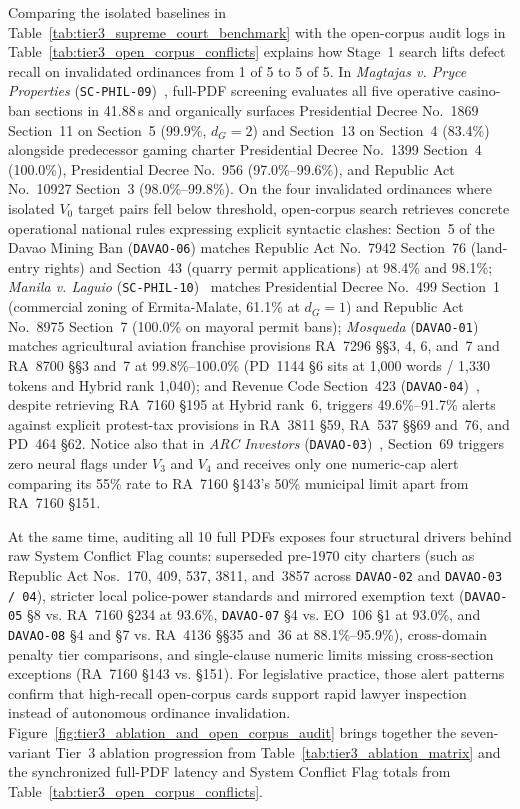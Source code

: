 Comparing the isolated baselines in Table~\ref{tab:tier3_supreme_court_benchmark} with the open-corpus audit logs in Table~\ref{tab:tier3_open_corpus_conflicts} explains how Stage~1 search lifts defect recall on invalidated ordinances from 1 of 5 to 5 of 5. In \textit{Magtajas v. Pryce Properties} (\texttt{SC-PHIL-09})~\cite{scp1994magtajasvpryce}, full-PDF screening evaluates all five operative casino-ban sections in 41.88\,s and organically surfaces Presidential Decree No.~1869 Section~11 on Section~5 (99.9\%, $d_G=2$) and Section~13 on Section~4 (83.4\%) alongside predecessor gaming charter Presidential Decree No.~1399 Section~4 (100.0\%), Presidential Decree No.~956 (97.0\%--99.6\%), and Republic Act No.~10927 Section~3 (98.0\%--99.8\%). On the four invalidated ordinances where isolated $V_0$ target pairs fell below threshold, open-corpus search retrieves concrete operational national rules expressing explicit syntactic clashes: Section~5 of the Davao Mining Ban (\texttt{DAVAO-06}) matches Republic Act No.~7942 Section~76 (land-entry rights) and Section~43 (quarry permit applications) at 98.4\% and 98.1\%; \textit{Manila v. Laguio} (\texttt{SC-PHIL-10})~\cite{scp2005manilavlaguio} matches Presidential Decree No.~499 Section~1 (commercial zoning of Ermita-Malate, 61.1\% at $d_G=1$) and Republic Act No.~8975 Section~7 (100.0\% on mayoral permit bans); \textit{Mosqueda} (\texttt{DAVAO-01})~\cite{scp2016mosqueda} matches agricultural aviation franchise provisions RA~7296 \S\S3, 4, 6, and~7 and RA~8700 \S\S3 and~7 at 99.8\%--100.0\% (PD~1144 \S6 sits at 1,000 words / 1,330 tokens and Hybrid rank 1,040); and Revenue Code Section~423 (\texttt{DAVAO-04})~\cite{scp2022firstmeridian,ctarocksteel139}, despite retrieving RA~7160 \S195 at Hybrid rank~6, triggers 49.6\%--91.7\% alerts against explicit protest-tax provisions in RA~3811 \S59, RA~537 \S\S69 and~76, and PD~464 \S62. Notice also that in \textit{ARC Investors} (\texttt{DAVAO-03})~\cite{scp2022davaovarc}, Section~69 triggers zero neural flags under $V_3$ and $V_4$ and receives only one numeric-cap alert comparing its 55\% rate to RA~7160 \S143's 50\% municipal limit apart from RA~7160 \S151.

At the same time, auditing all 10 full PDFs exposes four structural drivers behind raw System Conflict Flag counts: superseded pre-1970 city charters (such as Republic Act Nos.~170, 409, 537, 3811, and~3857 across \texttt{DAVAO-02} and \texttt{DAVAO-03 / 04}), stricter local police-power standards and mirrored exemption text (\texttt{DAVAO-05} \S8 vs. RA~7160 \S234 at 93.6\%, \texttt{DAVAO-07} \S4 vs. EO~106 \S1 at 93.0\%, and \texttt{DAVAO-08} \S4 and \S7 vs. RA~4136 \S\S35 and~36 at 88.1\%--95.9\%), cross-domain penalty tier comparisons, and single-clause numeric limits missing cross-section exceptions (RA~7160 \S143 vs. \S151). For legislative practice, those alert patterns confirm that high-recall open-corpus cards support rapid lawyer inspection instead of autonomous ordinance invalidation. Figure~\ref{fig:tier3_ablation_and_open_corpus_audit} brings together the seven-variant Tier~3 ablation progression from Table~\ref{tab:tier3_ablation_matrix} and the synchronized full-PDF latency and System Conflict Flag totals from Table~\ref{tab:tier3_open_corpus_conflicts}.

